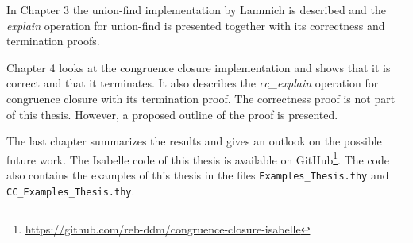 In Chapter 3 the union-find implementation by Lammich \cite{unionfind-isabelle} is described and the \emph{explain} operation for union-find is presented together with its correctness and termination proofs.

Chapter 4 looks at the congruence closure implementation and shows that it is correct and that it terminates. It also describes the \emph{cc\_explain} operation for congruence closure with its termination proof. The correctness proof is not part of this thesis. However, a proposed outline of the proof is presented.

The last chapter summarizes the results and gives an outlook on the possible future work.
The Isabelle code of this thesis is available on GitHub\footnote{\url{https://github.com/reb-ddm/congruence-closure-isabelle}}.
The code also contains the examples of this thesis in the files \lstinline|Examples_Thesis.thy| and \lstinline|CC_Examples_Thesis.thy|.

